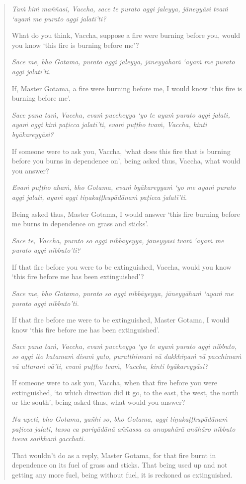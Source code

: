 \begin{quote}
\emph{Taṁ kiṁ maññasi, Vaccha, sace te purato aggi jaleyya, jāneyyāsi tvaṁ `ayaṁ me purato aggi jalatī'ti?}

What do you think, Vaccha, suppose a fire were burning before you, would you know `this fire is burning before me'?

\emph{Sace me, bho Gotama, purato aggi jaleyya, jāneyyāhaṁ `ayaṁ me purato aggi jalatī'ti.}

If, Master Gotama, a fire were burning before me, I would know `this fire is burning before me'.

\emph{Sace pana taṁ, Vaccha, evaṁ puccheyya `yo te ayaṁ purato aggi jalati, ayaṁ aggi kiṁ paṭicca jalatī'ti, evaṁ puṭṭho tvaṁ, Vaccha, kinti byākareyyāsi?}

If someone were to ask you, Vaccha, `what does this fire that is burning before you burns in dependence on', being asked thus, Vaccha, what would you answer?

\emph{Evaṁ puṭṭho ahaṁ, bho Gotama, evaṁ byākareyyaṁ `yo me ayaṁ purato aggi jalati, ayaṁ aggi tiṇakaṭṭhupādānaṁ paṭicca jalatī'ti}.

Being asked thus, Master Gotama, I would answer `this fire burning before me burns in dependence on grass and sticks'.

\emph{Sace te, Vaccha, purato so aggi nibbāyeyya, jāneyyāsi tvaṁ `ayaṁ me purato aggi nibbuto'ti?}

If that fire before you were to be extinguished, Vaccha, would you know `this fire before me has been extinguished'?

\emph{Sace me, bho Gotamo, purato so aggi nibbāyeyya, jāneyyāhaṁ `ayaṁ me purato aggi nibbuto'ti.}

If that fire before me were to be extinguished, Master Gotama, I would know `this fire before me has been extinguished'.

\emph{Sace pana taṁ, Vaccha, evaṁ puccheyya `yo te ayaṁ purato aggi nibbuto, so aggi ito katamaṁ disaṁ gato, puratthimaṁ vā dakkhiṇaṁ vā pacchimaṁ vā uttaraṁ vā'ti, evaṁ puṭṭho tvaṁ, Vaccha, kinti byākareyyāsi?}

If someone were to ask you, Vaccha, when that fire before you were extinguished, `to which direction did it go, to the east, the west, the north or the south', being asked thus, what would you answer?

\emph{Na upeti, bho Gotama, yañhi so, bho Gotama, aggi tiṇakaṭṭhupādānaṁ paṭicca jalati, tassa ca pariyādānā aññassa ca anupahārā anāhāro nibbuto tveva saṅkhaṁ gacchati.}

That wouldn't do as a reply, Master Gotama, for that fire burnt in dependence on its fuel of grass and sticks. That being used up and not getting any more fuel, being without fuel, it is reckoned as extinguished.
\end{quote}

